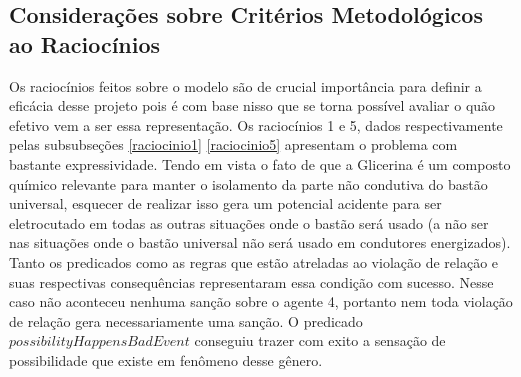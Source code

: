 \subsection{Considerações sobre Critérios Metodológicos ao Raciocínios}

Os raciocínios feitos sobre o modelo são de crucial importância para definir a eficácia desse projeto pois é com base nisso que se torna possível avaliar o quão efetivo vem a ser essa representação. Os raciocínios 1 e 5, dados respectivamente pelas subsubseções \ref{raciocinio1} \ref{raciocinio5} apresentam o problema com bastante expressividade. Tendo em vista o fato de que a Glicerina  é um composto químico relevante para manter o isolamento da parte não condutiva do bastão universal, esquecer de realizar isso gera um potencial acidente para ser eletrocutado em todas as outras situações onde o bastão será usado (a não ser nas situações onde o bastão universal não será usado em condutores energizados). Tanto os predicados como as regras que estão atreladas ao violação de relação e suas respectivas consequências representaram essa condição com sucesso. Nesse caso não aconteceu nenhuma sanção sobre o agente 4, portanto nem toda violação de relação gera necessariamente uma sanção. O predicado $possibilityHappensBadEvent$ conseguiu trazer com exito a sensação de possibilidade que existe em fenômeno desse gênero. 

